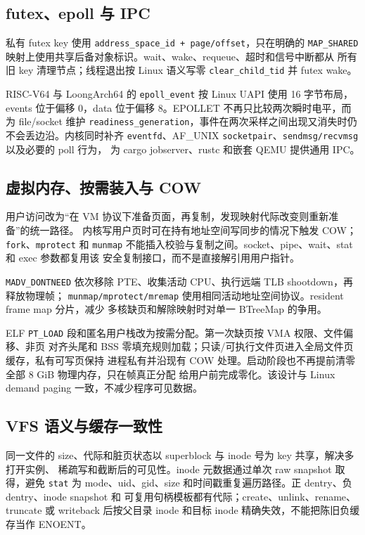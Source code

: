 \documentclass[UTF8,zihao=-4]{ctexart}
\newcommand{\code}{\nolinkurl}
\begin{document}
\subsection{futex、epoll 与 IPC}

私有 futex key 使用 \code{address_space_id + page/offset}，只在明确的
\code{MAP_SHARED} 映射上使用共享后备对象标识。wait、wake、requeue、超时和信号中断都从
所有旧 key 清理节点；线程退出按 Linux 语义写零 \code{clear_child_tid} 并 futex wake。

RISC-V64 与 LoongArch64 的 \code{epoll_event} 按 Linux UAPI 使用 16 字节布局，events
位于偏移 0，data 位于偏移 8。EPOLLET 不再只比较两次瞬时电平，而为 file/socket 维护
\code{readiness_generation}，事件在两次采样之间出现又消失时仍不会丢边沿。内核同时补齐
\code{eventfd}、AF_UNIX \code{socketpair}、\code{sendmsg/recvmsg} 以及必要的 poll 行为，
为 cargo jobserver、rustc 和嵌套 QEMU 提供通用 IPC。

\subsection{虚拟内存、按需装入与 COW}

用户访问改为“在 VM 协议下准备页面，再复制，发现映射代际改变则重新准备”的统一路径。
内核写用户页时可在持有地址空间写同步的情况下触发 COW；\code{fork}、\code{mprotect} 和
\code{munmap} 不能插入校验与复制之间。socket、pipe、wait、stat 和 exec 参数都复用该
安全复制接口，而不是直接解引用用户指针。

\code{MADV_DONTNEED} 依次移除 PTE、收集活动 CPU、执行远端 TLB shootdown，再释放物理帧；
\code{munmap/mprotect/mremap} 使用相同活动地址空间协议。resident frame map 分片，减少
多核缺页和解除映射时对单一 BTreeMap 的争用。

ELF \code{PT_LOAD} 段和匿名用户栈改为按需分配。第一次缺页按 VMA 权限、文件偏移、非页
对齐头尾和 BSS 零填充规则加载；只读/可执行文件页进入全局文件页缓存，私有可写页保持
进程私有并沿现有 COW 处理。启动阶段也不再提前清零全部 8 GiB 物理内存，只在帧真正分配
给用户前完成零化。该设计与 Linux demand paging 一致，不减少程序可见数据。

\subsection{VFS 语义与缓存一致性}

同一文件的 size、代际和脏页状态以 superblock 与 inode 号为 key 共享，解决多打开实例、
稀疏写和截断后的可见性。inode 元数据通过单次 raw snapshot 取得，避免 \code{stat} 为
mode、uid、gid、size 和时间戳重复遍历路径。正 dentry、负 dentry、inode snapshot 和
可复用句柄模板都有代际；create、unlink、rename、truncate 或 writeback 后按父目录 inode
和目标 inode 精确失效，不能把陈旧负缓存当作 ENOENT。
\end{document}

